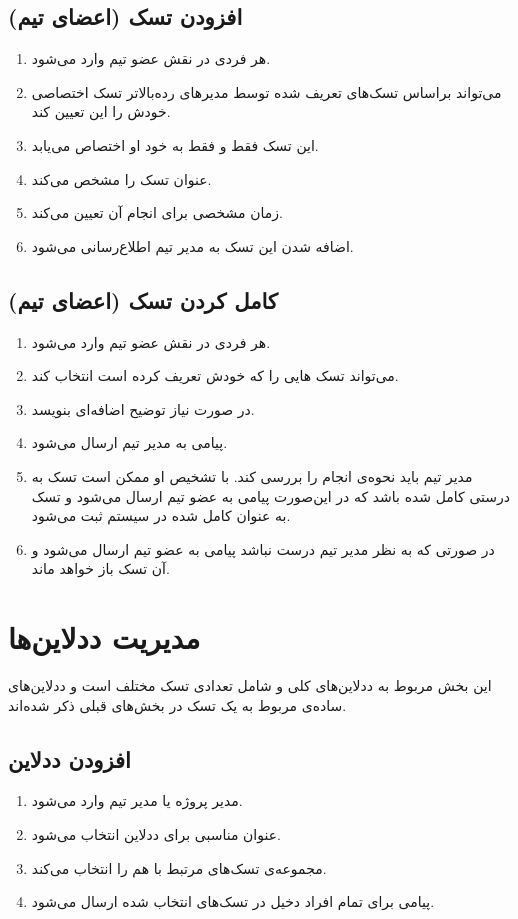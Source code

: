 \documentclass[10pt,a4paper]{article}
\begin{document}
\subsection{
افزودن تسک (اعضای تیم)
}
\begin{enumerate}
	\item
	هر فردی در نقش عضو تیم وارد می‌شود.
	\item
	می‌تواند براساس تسک‌های تعریف شده توسط مدیر‌های رده‌بالاتر تسک اختصاصی خودش را این تعیین کند.
	\item
	این تسک فقط و فقط به خود او اختصاص می‌یابد.
	\item
	عنوان تسک را مشخص می‌کند.
	\item
	زمان مشخصی برای انجام آن تعیین می‌کند.
	\item
	اضافه شدن این تسک به مدیر تیم اطلاع‌رسانی می‌شود.
\end{enumerate}

\subsection{
	کامل کردن تسک (اعضای تیم)
}
\begin{enumerate}
	\item
	هر فردی در نقش عضو تیم وارد می‌شود.
	\item
	می‌تواند تسک هایی را که خودش تعریف کرده است انتخاب کند.
	\item
	در صورت نیاز توضیح اضافه‌ای بنویسد.
	\item
	پیامی به مدیر تیم ارسال می‌شود.
	\item
	مدیر تیم باید نحوه‌ی انجام را بررسی کند. با تشخیص او ممکن است تسک به درستی کامل شده باشد که در این‌صورت پیامی به عضو تیم ارسال می‌شود و تسک به عنوان کامل شده در سیستم ثبت می‌شود.
	\item
	در صورتی که به نظر مدیر تیم درست نباشد پیامی به عضو تیم ارسال می‌شود و آن تسک باز خواهد ماند.
	
\end{enumerate}

\section{
	مدیریت ددلاین‌ها
}
این بخش مربوط به ددلاین‌های کلی و شامل تعدادی تسک مختلف است و ددلاین‌های ساده‌ی مربوط به یک تسک در بخش‌های قبلی ذکر شده‌اند.
\subsection{
افزودن ددلاین 
}
\begin{enumerate}
	\item 
	مدیر پروژه یا مدیر تیم وارد می‌شود.
	\item
	عنوان مناسبی برای ددلاین انتخاب می‌شود.
	\item
	مجموعه‌ی تسک‌های مرتبط با هم را انتخاب می‌کند.
	\item
	پیامی برای تمام افراد دخیل در تسک‌های انتخاب شده ارسال می‌شود.
\end{enumerate}
\end{document}
